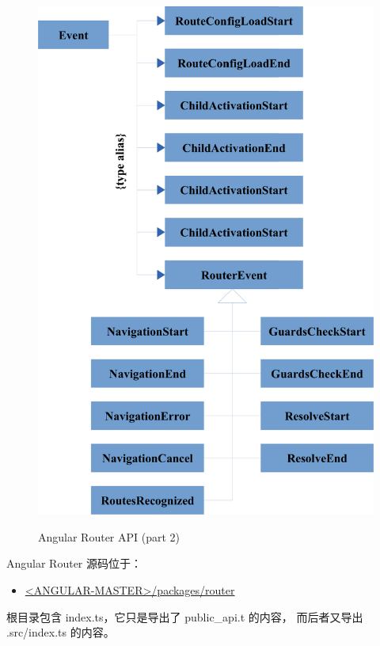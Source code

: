 \clearpage

\begin{figure}[!hbt]
  \centering
  \caption{Angular Router API (part 2)}
  \includegraphics[width=0.75\linewidth]{13_the_router_package/router_api_3}
  \label{fig:router_api_3}
\end{figure}

\clearpage


Angular Router 源码位于：

\begin{itemize}
  \item \href{https://github.com/angular/angular/tree/master/packages/router}
        {<ANGULAR-MASTER>/packages/router}
\end{itemize}


根目录包含 index.ts，它只是导出了 public\_api.t 的内容，
而后者又导出 .src/index.ts 的内容。


